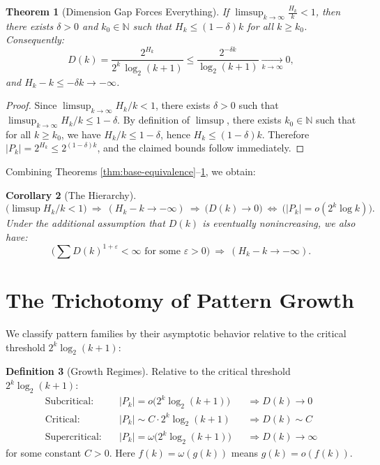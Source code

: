 \documentclass[11pt]{article}
\newtheorem{theorem}{Theorem}
\newtheorem{corollary}[theorem]{Corollary}
\theoremstyle{definition}
\newtheorem{definition}[theorem]{Definition}
\newcommand{\bbN}{\mathbb{N}}
\newcommand{\eps}{\varepsilon}
\begin{document}
\begin{theorem}[Dimension Gap Forces Everything]\label{thm:dimension-gap}
If $\displaystyle \limsup_{k\to\infty}\frac{H_k}{k}<1$, then there exists $\delta>0$ and $k_0 \in \bbN$ such that $H_k\le (1-\delta)k$ for all $k\ge k_0$. Consequently:
\begin{equation}
D(k)=\frac{2^{H_k}}{2^k\,\log_2(k+1)}\le\frac{2^{-\delta k}}{\log_2(k+1)}\xrightarrow[k\to\infty]{}0,
\end{equation}
and $H_k-k\le -\delta k\to -\infty$.
\end{theorem}

\begin{proof}
Since $\limsup_{k\to\infty} H_k/k < 1$, there exists $\delta > 0$ such that $\limsup_{k\to\infty} H_k/k \le 1-\delta$. By definition of $\limsup$, there exists $k_0 \in \bbN$ such that for all $k \ge k_0$, we have $H_k/k \le 1-\delta$, hence $H_k \le (1-\delta)k$. Therefore $|P_k|=2^{H_k}\le 2^{(1-\delta)k}$, and the claimed bounds follow immediately.
\end{proof}

Combining Theorems \ref{thm:base-equivalence}--\ref{thm:dimension-gap}, we obtain:

\begin{corollary}[The Hierarchy]\label{cor:hierarchy}
\begin{equation}\label{eq:lattice}
\big(\limsup H_k/k<1\big)\ \Rightarrow\ (H_k-k\to-\infty)\ \Rightarrow\ \big(D(k)\to 0\big)\ \Leftrightarrow\ \big(|P_k|=o(2^k\log k)\big).
\end{equation}
Under the additional assumption that $D(k)$ is eventually nonincreasing, we also have:
$$\big(\sum D(k)^{1+\eps} < \infty \text{ for some } \eps > 0\big)\ \Rightarrow\ (H_k-k\to-\infty).$$
\end{corollary}

\section{The Trichotomy of Pattern Growth}

We classify pattern families by their asymptotic behavior relative to the critical threshold $2^k\log_2(k+1)$:

\begin{definition}[Growth Regimes]\label{def:regimes}
Relative to the critical threshold $2^k \log_2(k+1)$:
\begin{align*}
\text{Subcritical:}&\quad |P_k|=o\big(2^k\log_2(k+1)\big) &&\Rightarrow D(k)\to 0\\
\text{Critical:}&\quad |P_k|\sim C\cdot 2^k\log_2(k+1) &&\Rightarrow D(k)\sim C\\
\text{Supercritical:}&\quad |P_k|=\omega\big(2^k\log_2(k+1)\big) &&\Rightarrow D(k)\to\infty
\end{align*}
for some constant $C > 0$. Here $f(k) = \omega(g(k))$ means $g(k) = o(f(k))$.
\end{definition}
\end{document}

